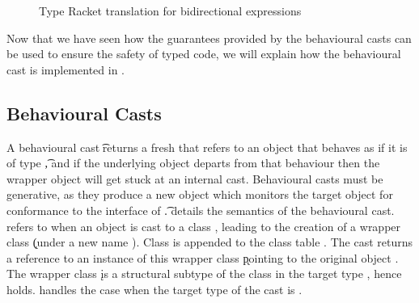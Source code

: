\documentclass[a4paper,USenglish]{tex/lipics-v2016}
\begin{document}
\begin{figure}[h!]
\begin{mathpar}

\end{mathpar}
\caption{Type Racket translation for bidirectional expressions}
\label{fig:behtrans_exp2}
\end{figure}


Now that we have seen how the guarantees provided by the behavioural casts can 
be used to ensure the safety of typed code, we will explain how the 
behavioural cast is implemented in \kafka.


\subsection{Behavioural Casts}

A behavioural cast \BehCast\t\a returns a fresh \ap that refers to an
object that behaves as if it is of type \t, and if the underlying object
departs from that behaviour then the wrapper object will get
stuck at an internal cast. Behavioural casts must be generative, as they produce
a new object which monitors the target object for conformance to the interface 
of \t.  details the semantics of the behavioural cast. 
 refers to when an object \obj\C{\b\a} is cast to a class \Cp,
leading to the creation of a wrapper class \k (under a new name \D). 
Class \D is appended to the class table \K.  The cast returns a reference \ap to an instance of
this wrapper class \k pointing to the original object \a. The wrapper class \k is a
structural subtype of the class in the target type \C, hence \D\Sub\C holds. 
handles the case when the target type of the cast is \any.
\end{document}
